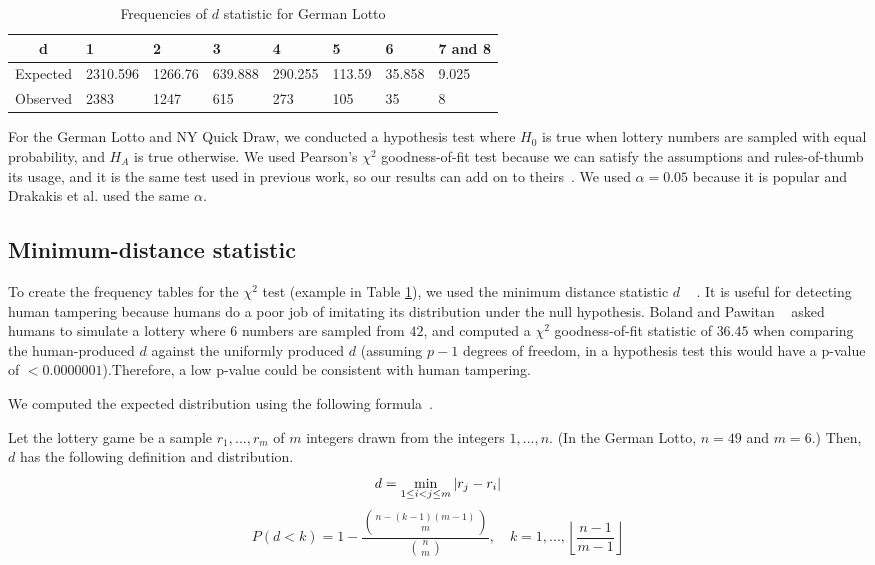 \begin{table}

\caption{Frequencies of $d$ statistic for German Lotto}
\centering
\begin{tabular}[t]{c|lllllll}
d & 1 & 2 & 3 & 4 & 5 & 6 & 7 and 8\\
\hline
Expected & 2310.596 & 1266.76 & 639.888 & 290.255 & 113.59 & 35.858 & 9.025\\
Observed & 2383 & 1247 & 615 & 273 & 105 & 35 & 8\\
\end{tabular}
\label{tab:frequencies_german}
\end{table}

For the German Lotto and NY Quick Draw, we conducted a hypothesis test where $H_0$ is true when lottery numbers are sampled with equal probability, and $H_A$ is true otherwise. We used Pearson's $\chi^2$ goodness-of-fit test because we can satisfy the assumptions and rules-of-thumb its usage, and it is the same test used in previous work, so our results can add on to theirs~\cite{Drakakis}. We used $\alpha = 0.05$ because it is popular and Drakakis et al. used the same $\alpha$.

\subsection{Minimum-distance statistic}

To create the frequency tables for the $\chi^2$ test (example in Table \ref{tab:frequencies_german}), we used the minimum distance statistic $d$ ~\cite{Drakakis} .
It is useful for detecting human tampering because humans do a
poor job of imitating its distribution under the null hypothesis. Boland and Pawitan ~\cite{trying_to_be_random} asked humans to simulate a lottery where $6$ numbers are sampled from $42$, and 
computed a $\chi^2$ goodness-of-fit statistic of $36.45$ when comparing the human-produced $d$ against the uniformly produced $d$ (assuming $p - 1$ degrees of freedom, in a hypothesis test this would have a p-value of $< 0.0000001$).Therefore, a low p-value could be consistent with human tampering.

We computed the expected distribution using the following formula~\cite{mindist_distribution}.

Let the lottery game be a sample $r_1,...,r_m$ of $m$ integers drawn from the integers $1,...,n$. 
(In the German Lotto, $n = 49$ and $m = 6$.)
Then, $d$ has the following definition and distribution.
\begin{equation}
    d = \min_{1 \leq i < j \leq m} | r_j - r_i |\\
\end{equation}
\begin{equation}
    P(d < k) = 1 - \frac{{n - (k - 1)(m - 1) \choose m}}{{n \choose m}}, \quad k = 1,..., \left\lfloor \frac{n - 1}{m - 1} \right\rfloor
\end{equation}

